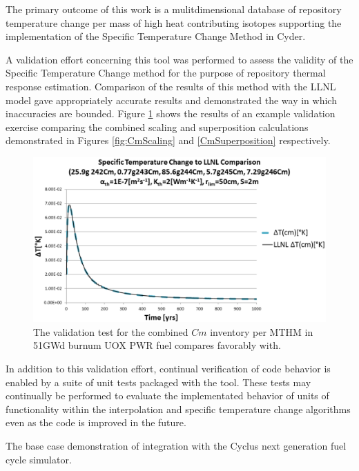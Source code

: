 
The primary outcome of this work is a mulitdimensional database of repository temperature 
change per mass of high heat contributing isotopes supporting the implementation 
of the Specific Temperature Change Method in Cyder. 

A validation effort concerning this tool was performed to assess the validity of 
the Specific Temperature Change method for the purpose of repository thermal 
response estimation. Comparison of the results of this method with the \gls{LLNL} model gave 
appropriately accurate results and demonstrated the way in which inaccuracies 
are bounded. Figure \ref{fig:CmValidation} shows the results of an example validation exercise comparing the combined scaling and  
superposition calculations demonstrated in Figures \ref{fig:CmScaling} and 
\ref{CmSuperposition} respectively.

\begin{figure}[htp!]
\begin{center}
\includegraphics[width=\columnwidth]{images/CmValidation.eps}
\end{center}
\caption{The validation test for the combined $Cm$ inventory per MTHM in 51GWd burnum UOX PWR fuel compares favorably with. }
\label{fig:CmValidation}
\end{figure}

In addition to this validation effort, continual verification of code behavior
is enabled by a suite of unit tests packaged with the tool. These tests may
continually be performed to evaluate the implementated behavior of units of
functionality within the interpolation and specific temperature change
algorithms even as the code is improved in the future.  

The base case demonstration of integration with the Cyclus next generation 
fuel cycle simulator.
